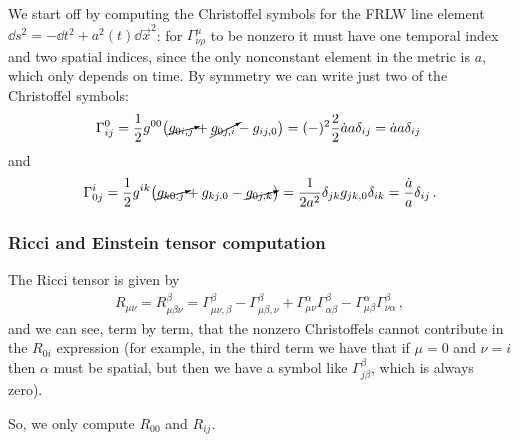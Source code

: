 \documentclass[main.tex]{subfiles}
\begin{document}
We start off by computing the Christoffel symbols for the FRLW line element \(\dd{s^2} = - \dd{t^2} + a^2(t) \dd{\vec{x}}^2\): for \(\Gamma^{\mu }_{\nu \rho }\) to be nonzero it must have one temporal index and two spatial indices, since the only nonconstant element in the metric is \(a\), which only depends on time. By symmetry we can write just two of the Christoffel symbols: 
%
\begin{align}
\Gamma^{0}_{ij} = \frac{1}{2} g^{00} \qty(\cancelto{}{g_{0i,j}} + \cancelto{}{g_{0j,i}} - g_{ij, 0}) = (-)^2 \frac{2}{2} \dot{a} a \delta_{ij} = \dot{a} a \delta_{ij} 
\,
\end{align}
%
and 
%
\begin{align}
\Gamma^{i}_{0j} = \frac{1}{2} g^{ik} \qty(\cancelto{}{g_{k0,j}} + g_{kj,0} - \cancelto{}{g_{0j,k}}) = \frac{1}{2a^2} \delta_{jk} g_{jk,0} \delta_{ik}  = \frac{\dot{a}}{a}  \delta_{ij} 
\,.
\end{align}

\subsubsection{Ricci and Einstein tensor computation}

The Ricci tensor is given by 
%
\begin{align}
R_{\mu \nu } = R^{\beta }_{\mu \beta \nu } 
= \Gamma^{\beta }_{\mu \nu  , \beta } 
- \Gamma^{\beta }_{\mu \beta , \nu } 
+ \Gamma^{\alpha }_{\mu \nu } \Gamma^{\beta }_{\alpha \beta } 
- \Gamma^{\alpha }_{\mu \beta } \Gamma^{\beta }_{\nu \alpha }
\,,
\end{align}
%
and we can see, term by term, that the nonzero Christoffels cannot contribute in the \(R_{0i}\) expression (for example, in the third term we have that if \(\mu = 0\) and \(\nu = i\) then \(\alpha \) must be spatial, but then we have a symbol like \(\Gamma^{\beta }_{j \beta }\), which is always zero). 

So, we only compute \(R_{00} \) and \(R_{ij}\). 
\end{document}
